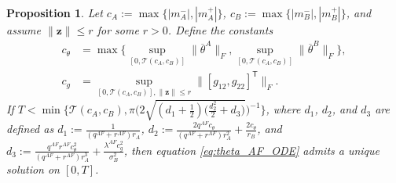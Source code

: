 \documentclass[letterpaper, 10 pt, conference]{ieeeconf}
\newcommand{\transpose}{^\mathsf{T}}
\newtheorem{proposition}{Proposition}
\begin{document}
\begin{proposition}%
\label{prop:exist_unique_thetaAF}
    Let $c_A := \max\{|m_A^-|, |m_A^+|\}$, $c_B := \max\{|m_B^-|, |m_B^+|\}$, and assume $\|\bm{z}\| \leq r$ for some $r>0$.  Define the constants 
    \begin{align*}
        c_\theta &= \max\Big\{\sup\limits_{[0,\mathcal{T}(c_A,c_B)]}\|\overline{\theta}^A\|_F, \sup\limits_{[0,\mathcal{T}(c_A,c_B)]}\|\overline{\theta}^B\|_F\Big\},\\
        c_g &= \sup\limits_{[0,\mathcal{T}(c_A,c_B)], \|\bm{z}\| \leq r}\|[ g_{12}, g_{22}]\transpose \|_F.  
    \end{align*}
    If $T < \min\big\{\mathcal{T}(c_A, c_B), \pi\big(2\sqrt{(d_1 + \tfrac{1}{2})\big(\tfrac{d_2^2}{2} + d_3\big)}\big)^{-1}\big\}$,
    where $d_1$, $d_2$, and $d_3$ are defined as 
        $d_1 := \tfrac{1}{( q^{AF}+ r^{AF})r_A}$,  $d_2 := \tfrac{2  q^{AF} c_\theta}{( q^{AF} +  r^{AF})r_A^2} + \tfrac{2 c_\theta}{r_B}$, and  $d_3 := \tfrac{ q^{AF}  r^{AF} c_\theta^2}{( q^{AF} +  r^{AF})r_A^3} + \tfrac{ \lambda^{AF} c_g^2}{\sigma_B^2}$,
    then equation \eqref{eq:theta_AF_ODE} admits a unique solution on \([0,T]\).
\end{proposition}

\end{document}
